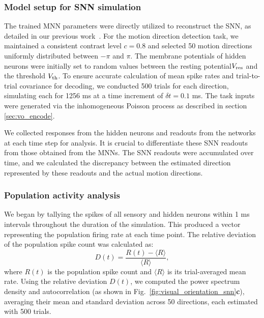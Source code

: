 \subsubsection{Model setup for SNN simulation}
The trained MNN parameters were directly utilized to reconstruct the SNN, as detailed in our previous work~\cite{Qi2023}. For the motion direction detection task, we maintained a consistent contrast level \(c = 0.8\) and selected 50 motion directions uniformly distributed between \(-\pi\) and \(\pi\).
The membrane potentials of hidden neurons were initially set to random values between the resting potential\(V_{\rm res}\) and the threshold  \(V_{\rm th}\). 
To ensure accurate calculation of mean spike rates and trial-to-trial covariance for decoding, we conducted 500 trials for each direction, simulating each for 1256 ms at a time increment of \(\delta t = 0.1\) ms. 
The task inputs were generated via the inhomogeneous Poisson process as described in section \ref{sec:vo_encode}.

We collected responses from the hidden neurons and readouts from the networks at each time step for analysis. 
It is crucial to differentiate these SNN readouts from those obtained from the MNNs. 
The SNN readouts were accumulated over time, and we calculated the discrepancy between the estimated direction represented by these readouts and the actual motion directions.
\subsubsection{Population activity analysis}
We began by tallying the spikes of all sensory and hidden neurons within 1 ms intervals throughout the duration of the simulation. 
This produced a vector representing the population firing rate at each time point. 
The relative deviation of the population spike count was calculated as:
\begin{equation}
D(t) = \frac{R(t) - \langle R \rangle}{\langle R \rangle}, 
\end{equation}
where \(R(t)\) is the population spike count and \(\langle R \rangle\) is its trial-averaged mean rate. 
Using the relative deviation \(D(t)\), we computed the power spectrum density and autocorrelation (as shown in Fig.~\ref{fig:visual_orientation_snn}\textbf{c}), averaging their mean and standard deviation across 50 directions, each estimated with 500 trials.

